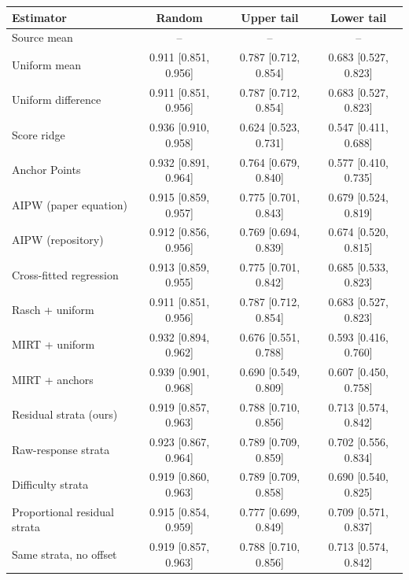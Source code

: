 \begin{tabular}{lccc}
\toprule
Estimator & Random & Upper tail & Lower tail \\
\midrule
Source mean & -- & -- & -- \\
Uniform mean & 0.911 [0.851, 0.956] & 0.787 [0.712, 0.854] & 0.683 [0.527, 0.823] \\
Uniform difference & 0.911 [0.851, 0.956] & 0.787 [0.712, 0.854] & 0.683 [0.527, 0.823] \\
Score ridge & 0.936 [0.910, 0.958] & 0.624 [0.523, 0.731] & 0.547 [0.411, 0.688] \\
Anchor Points & 0.932 [0.891, 0.964] & 0.764 [0.679, 0.840] & 0.577 [0.410, 0.735] \\
AIPW (paper equation) & 0.915 [0.859, 0.957] & 0.775 [0.701, 0.843] & 0.679 [0.524, 0.819] \\
AIPW (repository) & 0.912 [0.856, 0.956] & 0.769 [0.694, 0.839] & 0.674 [0.520, 0.815] \\
Cross-fitted regression & 0.913 [0.859, 0.955] & 0.775 [0.701, 0.842] & 0.685 [0.533, 0.823] \\
Rasch + uniform & 0.911 [0.851, 0.956] & 0.787 [0.712, 0.854] & 0.683 [0.527, 0.823] \\
MIRT + uniform & 0.932 [0.894, 0.962] & 0.676 [0.551, 0.788] & 0.593 [0.416, 0.760] \\
MIRT + anchors & 0.939 [0.901, 0.968] & 0.690 [0.549, 0.809] & 0.607 [0.450, 0.758] \\
Residual strata (ours) & 0.919 [0.857, 0.963] & 0.788 [0.710, 0.856] & 0.713 [0.574, 0.842] \\
Raw-response strata & 0.923 [0.867, 0.964] & 0.789 [0.709, 0.859] & 0.702 [0.556, 0.834] \\
Difficulty strata & 0.919 [0.860, 0.963] & 0.789 [0.709, 0.858] & 0.690 [0.540, 0.825] \\
Proportional residual strata & 0.915 [0.854, 0.959] & 0.777 [0.699, 0.849] & 0.709 [0.571, 0.837] \\
Same strata, no offset & 0.919 [0.857, 0.963] & 0.788 [0.710, 0.856] & 0.713 [0.574, 0.842] \\
\bottomrule
\end{tabular}
